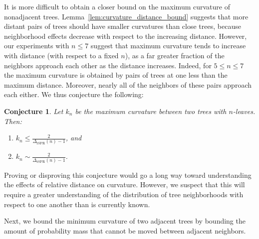 \documentclass[]{elsarticle}
\newtheorem{conj}[thm]{Conjecture}
\begin{document}
It is more difficult to obtain a closer bound on the maximum curvature of nonadjacent trees.
Lemma~\ref{lem:curvature_distance_bound} suggests that more distant pairs of trees should have smaller curvatures than close trees, because neighborhood effects decrease with respect to the increasing distance.
However, our experiments with $n \le 7$ suggest that maximum curvature tends to increase with distance (with respect to a fixed $n$), as a far greater fraction of the neighbors approach each other as the distance increases.
Indeed, for $5 \le n \le 7$ the maximum curvature is obtained by pairs of trees at one less than the maximum distance.
Moreover, nearly all of the neighbors of these pairs approach each either.
We thus conjecture the following:
\begin{conj}
	Let $k_n$ be the maximum curvature between two trees with $n$-leaves.
	Then:
	\begin{enumerate}
		\item $k_n \le \frac{2}{\Delta_{\text{rSPR}}(n)-1}$, and
		\item $ k_n \sim \frac{2}{\Delta_{\text{rSPR}}(n)-1}$.
	\end{enumerate}
\end{conj}
Proving or disproving this conjecture would go a long way toward understanding the effects of relative distance on curvature.
However, we suspect that this will require a greater understanding of the distribution of tree neighborhoods with respect to one another than is currently known.

Next, we bound the minimum curvature of two adjacent trees by bounding the amount of probability mass that cannot be moved between adjacent neighbors.
\end{document}
